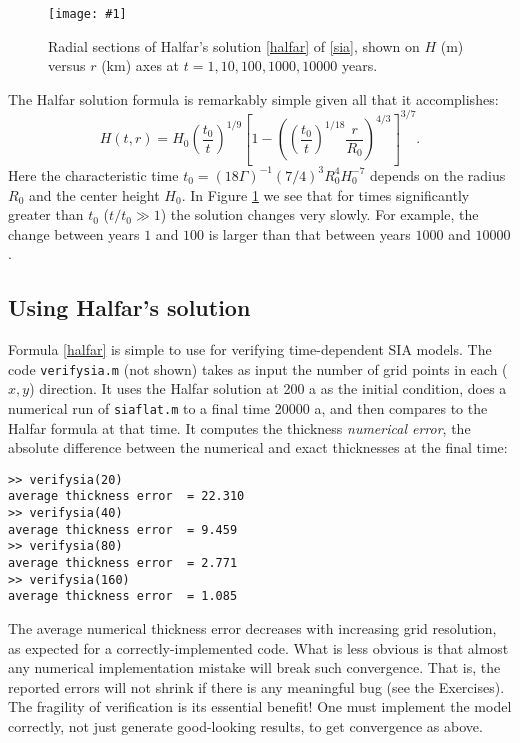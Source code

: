 \documentclass[letterpaper,final,12pt,reqno]{amsart}
\newcommand{\onefigsize}[3]{
\begin{figure}[ht]
\centering
\texttt{[image: \#1]}
\caption{#2}
\label{fig:#1}
\end{figure}}
\begin{document}
\onefigsize{siascaling}{Radial sections of Halfar's solution \eqref{halfar} of \eqref{sia}, shown on $H$ (m) versus $r$ (km) axes at $t=1,10,100,1000,10000$ years.}{5.5in}

The Halfar solution formula is remarkably simple given all that it accomplishes:
\begin{equation}
H(t,r) = H_0 \left(\frac{t_0}{t}\right)^{1/9} \left[1 - \left(\left(\frac{t_0}{t}\right)^{1/18} \frac{r}{R_0}\right)^{4/3}\right]^{3/7}. \label{halfar}
\end{equation}
Here the characteristic time $t_0 = (18 \Gamma)^{-1} (7/4)^3 R_0^4 H_0^{-7}$ depends on the radius $R_0$ and the center height $H_0$.  In Figure \ref{fig:siascaling} we see that for times significantly greater than $t_0$ ($t/t_0 \gg 1$) the solution changes very slowly.  For example, the change between years $1$ and $100$ is larger than that between years $1000$ and $10000$.

\subsection*{Using Halfar's solution}  Formula \eqref{halfar} is simple to use for verifying time-dependent SIA models.  The code \texttt{verifysia.m} (not shown) takes as input the number of grid points in each ($x,y$) direction.  It uses the Halfar solution at 200 a as the initial condition, does a numerical run of \texttt{siaflat.m} to a final time 20000 a, and then compares to the Halfar formula at that time.  It computes the thickness \emph{numerical error}, the absolute difference between the numerical and exact thicknesses at the final time:
\small
\begin{verbatim}
>> verifysia(20)
average thickness error  = 22.310
>> verifysia(40)
average thickness error  = 9.459
>> verifysia(80)
average thickness error  = 2.771
>> verifysia(160)
average thickness error  = 1.085
\end{verbatim}
\normalsize

The average numerical thickness error decreases with increasing grid resolution, as expected for a correctly-implemented code.  What is less obvious is that almost any numerical implementation mistake will break such convergence.  That is, the reported errors will not shrink if there is any meaningful bug (see the Exercises).  The fragility of verification is its essential benefit!  One must implement the model correctly, not just generate good-looking results, to get convergence as above.
\end{document}
